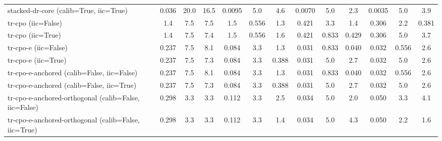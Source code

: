 \begin{table}[htbp]
\begin{tabular}{l|cccccccccccc}
stacked-dr-core (calib=True, iic=True) & 0.036 & 20.0 & 16.5 & 0.0095 & 5.0 & 4.6 & 0.0070 & 5.0 & 2.3 & 0.0035 & 5.0 & 3.9 \\
tr-cpo (iic=False) & 1.4 & 7.5 & 7.5 & 1.5 & 0.556 & 1.3 & 0.421 & 3.3 & 1.4 & 0.306 & 2.2 & 0.381 \\
tr-cpo (iic=True) & 1.4 & 7.5 & 7.4 & 1.5 & 0.556 & 1.6 & 0.421 & 0.833 & 0.429 & 0.306 & 5.0 & 3.7 \\
tr-cpo-e (iic=False) & 0.237 & 7.5 & 8.1 & 0.084 & 3.3 & 1.3 & 0.031 & 0.833 & 0.040 & 0.032 & 0.556 & 2.6 \\
tr-cpo-e (iic=True) & 0.237 & 7.5 & 7.3 & 0.084 & 3.3 & 0.388 & 0.031 & 5.0 & 2.7 & 0.032 & 5.0 & 2.6 \\
tr-cpo-e-anchored (calib=False, iic=False) & 0.237 & 7.5 & 8.1 & 0.084 & 3.3 & 1.3 & 0.031 & 0.833 & 0.040 & 0.032 & 0.556 & 2.6 \\
tr-cpo-e-anchored (calib=False, iic=True) & 0.237 & 7.5 & 7.3 & 0.084 & 3.3 & 0.388 & 0.031 & 5.0 & 2.7 & 0.032 & 5.0 & 2.6 \\
tr-cpo-e-anchored-orthogonal (calib=False, iic=False) & 0.298 & 3.3 & 3.3 & 0.112 & 3.3 & 2.5 & 0.034 & 5.0 & 2.0 & 0.050 & 3.3 & 4.1 \\
tr-cpo-e-anchored-orthogonal (calib=False, iic=True) & 0.298 & 3.3 & 3.3 & 0.112 & 3.3 & 1.4 & 0.034 & 5.0 & 4.3 & 0.050 & 2.2 & 1.6 \\
\bottomrule
\end{tabular}
\end{table}